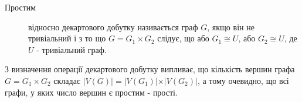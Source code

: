\begin{description}
\item[Простим] відносно декартового добутку називається граф $G$, якщо він не тривіальний і з то що $G=G_1 \times G_2$ слідує, що або $G_1 \cong U$, або $G_2 \cong U$, де $U$ - тривіальний граф.
\end{description}

З визначення операції декартового добутку випливає, що кількість вершин графа $G=G_1 \times G_2$ складає $\vert V(G) \vert = \vert V(G_1) \vert \times \vert V(G_2) \vert$, а тому очевидно, що всі графи, у яких число вершин є простим - прості.
